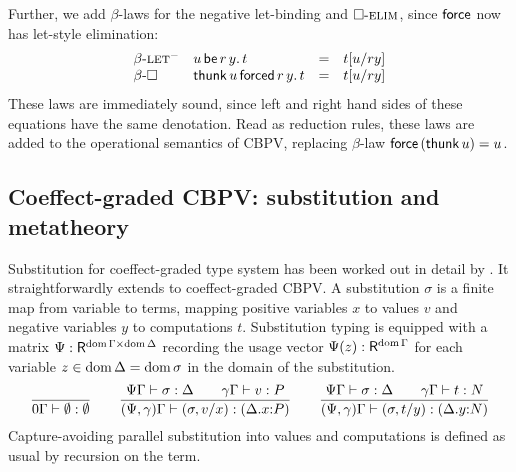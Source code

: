 \documentclass[acmsmall,review,anonymous]{acmart}\settopmatter{printfolios=true,printccs=false,printacmref=false}
\begin{document}
Further, we add $\beta$-laws for the negative
let-binding and $\relim\Box$, since $\tforce$ now has let-style elimination:
\[
\begin{array}{llcl}
\rbeta{\rlet^{-}}
  & \qlet r y u t
  & = & \qsubst u r y t
\\
\rbeta\Box
  & \qforced r {\thunk u} y t
  & = & \qsubst u r y t
\\
\end{array}
\]
These laws are immediately sound, since left and right hand sides of
these equations have the same denotation.
%
Read as reduction rules, these laws are added to the operational
semantics of CBPV, replacing $\beta$-law $\force{(\thunk u)} = u$.

\subsection{Coeffect-graded CBPV: substitution and metatheory}

Substitution for coeffect-graded type system has been worked
out in detail by \citet{atkeyWood:types19,woodAtkey:linearity20}.
It straightforwardly extends to coeffect-graded CBPV.
%
A substitution $\sigma$ is a finite map from variable to terms,
mapping positive variables $x$ to values $v$ and negative variables
$y$ to computations $t$.  Substitution typing
\fbox{$\SubstTy \Psi \Gamma \sigma \Delta$} is equipped with a matrix
$\Psi : \R^{\dom\Gamma \times \dom\Delta}$ recording the usage
vector $\Psi(z) : \R^{\dom\Gamma}$ for each variable
$z \in \dom\Delta = \dom \sigma$ in the domain of the substitution.
\[
  \ru{
    }{\SubstTy {0} \Gamma \sempty \cempty}
\qquad
  \ru{\SubstTy \Psi \Gamma \sigma \Delta \qquad
      \qValTy \gamma \Gamma v P
    }{\pSubstTy {\Psi,\gamma} \Gamma {\sext \sigma x v} {\ext \Delta x P}}
\qquad
  \ru{\SubstTy \Psi \Gamma \sigma \Delta \qquad
      \qCompTy \gamma \Gamma t N
    }{\pSubstTy {\Psi,\gamma} \Gamma {\sext \sigma y t} {\ext \Delta y N}}
\]
Capture-avoiding parallel substitution into values  and
computations  is defined as usual by recursion on the term.
\end{document}
